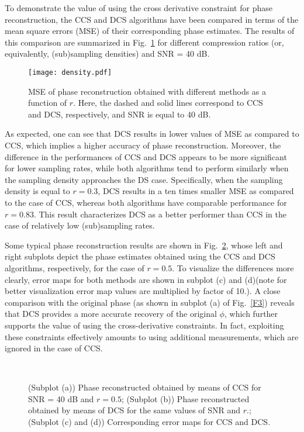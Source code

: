\pdfoutput=1 \documentclass[journal]{IEEEtran}
\begin{document}
To demonstrate the value of using the cross derivative constraint for phase reconstruction, the CCS and DCS algorithms have been compared in terms of the mean square errors (MSE) of their corresponding phase estimates. The results of this comparison are summarized in Fig.~\ref{F4} for different compression ratios (or, equivalently, (sub)sampling densities) and SNR = 40 dB.

\begin{figure}[!t]
\centering
\texttt{[image: density.pdf]}
\label{fig1:tabsubfig2}
\caption{MSE of phase reconstruction obtained with different methods as a function of $r$. Here, the dashed and solid lines correspond to CCS and DCS, respectively, and SNR is equal to 40 dB.}
\label{F4}
\end{figure}

As expected, one can see that DCS results in lower values of MSE as compared to CCS, which implies a higher accuracy of phase reconstruction. Moreover, the difference in the performances of  CCS and DCS appears to be more significant for lower sampling rates, while both algorithms tend to perform similarly when the sampling density approaches the DS case. Specifically, when the sampling density is equal to $r=0.3$, DCS results in a ten times smaller MSE as compared to the case of CCS, whereas both algorithms have comparable performance for $r = 0.83$. This result characterizes DCS as a better performer than CCS in the case of relatively low (sub)sampling rates.

Some typical phase reconstruction results are shown in Fig.~\ref{F5}, whose left and right subplots depict the phase estimates obtained using the CCS and DCS algorithms, respectively, for the case of $r = 0.5$. To visualize the differences more clearly, error maps for both methods are shown in subplot (c) and (d)(note for better visualization error map values are multiplied by factor of 10.). A close comparison with the original phase (as shown in subplot (a) of Fig.~\ref{F3}) reveals that DCS provides a more accurate recovery of the original $\phi$, which further supports the value of using the cross-derivative constraints. In fact, exploiting these constraints effectively amounts to using additional measurements, which are ignored in the case of CCS.

\begin{figure}[!t]
\\
\caption{(Subplot (a)) Phase reconstructed obtained by means of CCS for SNR = 40 dB and $r=0.5$; (Subplot (b)) Phase reconstructed obtained by means of DCS for the same values of SNR and $r$.; (Subplot (c) and (d)) Corresponding error maps for CCS and DCS.}
\label{F5}
\end{figure}
\end{document}
